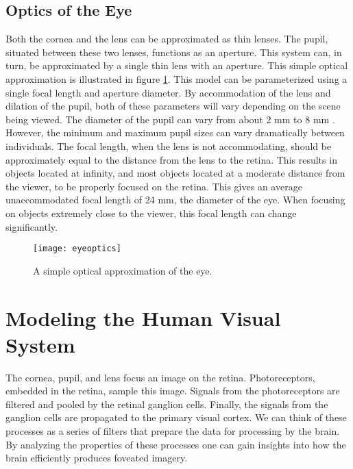 \documentclass{article}
\begin{document}
\subsection{Optics of the Eye}
Both the cornea and the lens can be approximated as thin lenses.
The pupil, situated between these two lenses, functions as an aperture.
This system can, in turn, be approximated by a single thin lens with an aperture.
This simple optical approximation is illustrated in figure \ref{eyeoptics}.
This model can be parameterized using a single focal length and aperture diameter.
By accommodation of the lens and dilation of the pupil, both of these parameters will vary depending on the scene being viewed.
The diameter of the pupil can vary from about 2 mm to 8 mm \cite{Hecht2001}.
However, the minimum and maximum pupil sizes can vary dramatically between individuals.
The focal length, when the lens is not accommodating, should be approximately equal to the distance from the lens to the retina.
This results in objects located at infinity, and most objects located at a moderate distance from the viewer, to be properly focused on the retina.
This gives an average unaccommodated focal length of 24 mm, the diameter of the eye.
When focusing on objects extremely close to the viewer, this focal length can change significantly.

\begin{figure}[!htbp]
\centering
\texttt{[image: eyeoptics]}
\caption{A simple optical approximation of the eye.}
\label{eyeoptics}
\end{figure}

\section{Modeling the Human Visual System}
The cornea, pupil, and lens focus an image on the retina.
Photoreceptors, embedded in the retina, sample this image. 
Signals from the photoreceptors are filtered and pooled by the retinal ganglion cells.
Finally, the signals from the ganglion cells are propagated to the primary visual cortex.
We can think of these processes as a series of filters that prepare the data for processing by the brain.
By analyzing the properties of these processes one can gain insights into how the brain efficiently produces foveated imagery.
\end{document}
